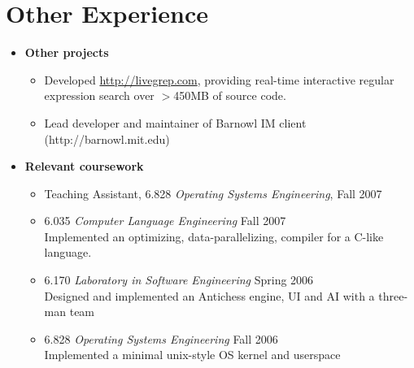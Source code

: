 \documentclass[letterpaper,10pt]{article}
\begin{document}
\section*{Other Experience}
\vspace*{-0.2cm}
\begin{itemize}
  \item \textbf{Other projects} \\
    \vspace*{-0.5cm}
    \begin{itemize}
    \item Developed \url{http://livegrep.com}, providing real-time
      interactive regular expression search over $>$450MB of source
      code.
    \item Lead developer and maintainer of Barnowl IM client
      (http://barnowl.mit.edu)
    \end{itemize}

  \item \textbf{Relevant coursework}
  \begin{itemize}
      \item Teaching Assistant, 6.828 {\em Operating Systems Engineering}, Fall 2007
      \item 6.035 {\em Computer Language Engineering} Fall 2007 \\
        Implemented an optimizing, data-parallelizing, compiler for a
        C-like language.
      \item 6.170 {\em Laboratory in Software Engineering} Spring 2006 \\
        Designed and implemented an Antichess engine, UI and AI with a three-man team
      \item 6.828 {\em Operating Systems Engineering} Fall 2006 \\
        Implemented a minimal unix-style OS kernel and userspace
  \end{itemize}
\end{itemize}
\end{document}
